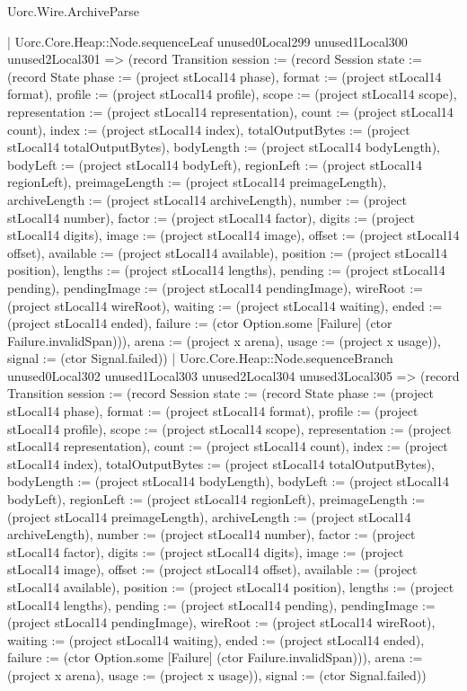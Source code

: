 \begin{lexlean}{Uorc.Wire.ArchiveParse}
\begin{semanticmodule}
{            | Uorc.Core.Heap::Node.sequenceLeaf unused0Local299 unused1Local300 unused2Local301 => (record Transition {session := (record Session {state := (record State {phase := (project stLocal14 phase), format := (project stLocal14 format), profile := (project stLocal14 profile), scope := (project stLocal14 scope), representation := (project stLocal14 representation), count := (project stLocal14 count), index := (project stLocal14 index), totalOutputBytes := (project stLocal14 totalOutputBytes), bodyLength := (project stLocal14 bodyLength), bodyLeft := (project stLocal14 bodyLeft), regionLeft := (project stLocal14 regionLeft), preimageLength := (project stLocal14 preimageLength), archiveLength := (project stLocal14 archiveLength), number := (project stLocal14 number), factor := (project stLocal14 factor), digits := (project stLocal14 digits), image := (project stLocal14 image), offset := (project stLocal14 offset), available := (project stLocal14 available), position := (project stLocal14 position), lengths := (project stLocal14 lengths), pending := (project stLocal14 pending), pendingImage := (project stLocal14 pendingImage), wireRoot := (project stLocal14 wireRoot), waiting := (project stLocal14 waiting), ended := (project stLocal14 ended), failure := (ctor Option.some [Failure] (ctor Failure.invalidSpan))}), arena := (project x arena), usage := (project x usage)}), signal := (ctor Signal.failed)})
            | Uorc.Core.Heap::Node.sequenceBranch unused0Local302 unused1Local303 unused2Local304 unused3Local305 => (record Transition {session := (record Session {state := (record State {phase := (project stLocal14 phase), format := (project stLocal14 format), profile := (project stLocal14 profile), scope := (project stLocal14 scope), representation := (project stLocal14 representation), count := (project stLocal14 count), index := (project stLocal14 index), totalOutputBytes := (project stLocal14 totalOutputBytes), bodyLength := (project stLocal14 bodyLength), bodyLeft := (project stLocal14 bodyLeft), regionLeft := (project stLocal14 regionLeft), preimageLength := (project stLocal14 preimageLength), archiveLength := (project stLocal14 archiveLength), number := (project stLocal14 number), factor := (project stLocal14 factor), digits := (project stLocal14 digits), image := (project stLocal14 image), offset := (project stLocal14 offset), available := (project stLocal14 available), position := (project stLocal14 position), lengths := (project stLocal14 lengths), pending := (project stLocal14 pending), pendingImage := (project stLocal14 pendingImage), wireRoot := (project stLocal14 wireRoot), waiting := (project stLocal14 waiting), ended := (project stLocal14 ended), failure := (ctor Option.some [Failure] (ctor Failure.invalidSpan))}), arena := (project x arena), usage := (project x usage)}), signal := (ctor Signal.failed)})
}
\end{semanticmodule}
\end{lexlean}
